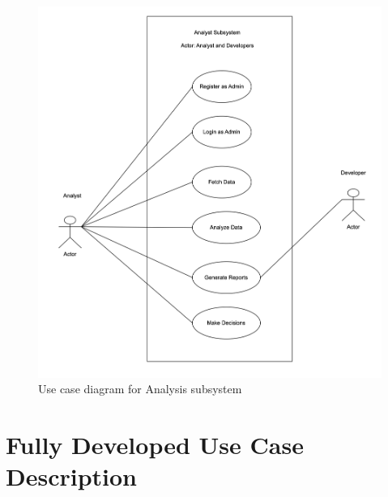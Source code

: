\begin{figure}[h!t]
    \centering
    \includegraphics[width=\textwidth]{images/ucAnaysis.png}
    \caption{Use case diagram for Analysis subsystem}
    \label{fig:ucAnaysis}
\end{figure}


\section{Fully Developed Use Case Description}

